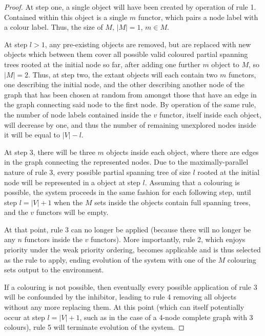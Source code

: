 \begin{proof}
At step one, a single \bo{} object will have been created by operation of rule 1.  Contained within this \bo{} object is a single \(m\) functor, which pairs a node label with a colour label.  Thus, the size of \(M\), \(|M|=1\), \(m \in M\).

At step \(l > 1\), any pre-existing \bo{} objects are removed, but are replaced with new \bo{} objects which between them cover all possible valid coloured partial spanning trees rooted at the initial node so far, after adding one further \(m\) object to \(M\), so \(|M|=2\).  Thus, at step two, the extant \bo{} objects will each contain two \(m\) functors, one describing the initial node, and the other describing another node of the graph that has been chosen at random from amongst those that have an edge in the graph connecting said node to the first node.  By operation of the same rule, the number of node labels contained inside the \(v\) functor, itself inside each \bo{} object, will decrease by one, and thus the number of remaining unexplored nodes inside it will be equal to \(|V| - l\).

At step 3, there will be three \(m\) objects inside each \bo{} object, where there are edges in the graph connecting the represented nodes.  Due to the maximally-parallel nature of rule 3, every possible partial spanning tree of size \(l\) rooted at the initial node will be represented in a \bo{} object at step \(l\).  Assuming that a colouring is possible, the system proceeds in the same fashion for each following step, until step \(l = |V| + 1\) when the \(M\) sets inside the \bo{} objects contain full spanning trees, and the \(v\) functors will be empty.

At that point, rule 3 can no longer be applied (because there will no longer be any \(n\) functors inside the \(v\) functors).  More importantly, rule 2, which enjoys priority under the weak priority ordering, becomes applicable and is thus selected as the rule to apply, ending evolution of the system with one of the \(M\) colouring sets output to the environment.

If a colouring is not possible, then eventually every possible application of rule 3 will be confounded by the inhibitor, leading to rule 4 removing all \bo{} objects without any more replacing them.  At this point (which can itself potentially occur at step \(l = |V| + 1\), such as in the case of a 4-node complete graph with 3 colours), rule 5 will terminate evolution of the system.
\end{proof}

